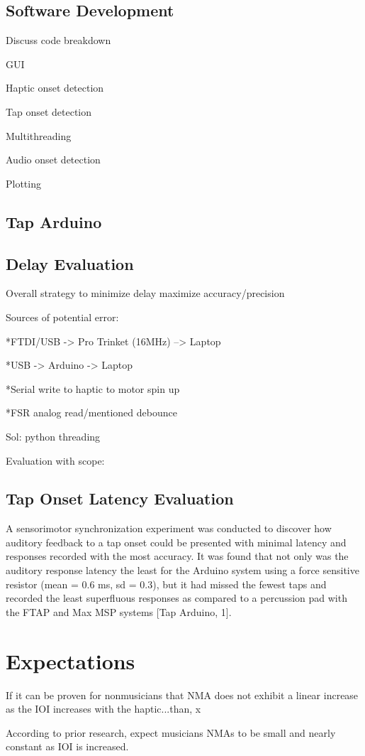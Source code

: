 \subsection{Software Development} \label{development}
            Discuss code breakdown
            
            GUI
            
            Haptic onset detection
            
            Tap onset detection
            
            Multithreading
            
            Audio onset detection
            
            Plotting

\subsection{Tap Arduino}    \label{tap_arduino}

\subsection{Delay Evaluation}

Overall strategy to minimize delay maximize accuracy/precision

Sources of potential error:

    *FTDI/USB -> Pro Trinket (16MHz) --> Laptop

    *USB -> Arduino -> Laptop

    *Serial write to haptic to motor spin up

    *FSR analog read/mentioned debounce

    Sol: python threading

    Evaluation with scope:

\subsection{Tap Onset Latency Evaluation}

A sensorimotor synchronization experiment was conducted to discover how auditory feedback to a tap onset could be presented with minimal latency and responses recorded with the most accuracy. It was found that not only was the auditory response latency the least for the Arduino system using a force sensitive resistor (mean = 0.6 ms, sd = 0.3), but it had missed the fewest taps and recorded the least superfluous responses as compared to a percussion pad with the FTAP and Max MSP systems [Tap Arduino, 1].


\section{Expectations}

If it can be proven for nonmusicians that NMA does not exhibit a linear increase as the IOI increases with the haptic...than, x

According to prior research, expect musicians NMAs to be small and nearly constant as IOI is increased.\cite{repp2013sensorimotor,4}



